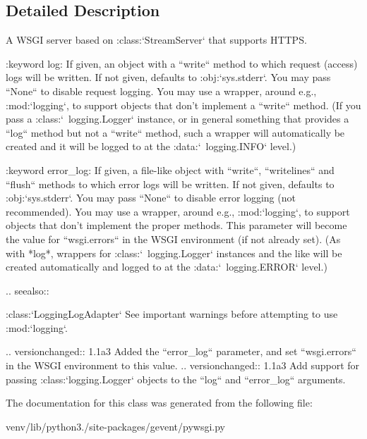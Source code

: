 \subsection{Detailed Description}
\begin{DoxyVerb}A WSGI server based on :class:`StreamServer` that supports HTTPS.


:keyword log: If given, an object with a ``write`` method to which
    request (access) logs will be written. If not given, defaults
    to :obj:`sys.stderr`. You may pass ``None`` to disable request
    logging. You may use a wrapper, around e.g., :mod:`logging`,
    to support objects that don't implement a ``write`` method.
    (If you pass a :class:`~logging.Logger` instance, or in
    general something that provides a ``log`` method but not a
    ``write`` method, such a wrapper will automatically be created
    and it will be logged to at the :data:`~logging.INFO` level.)

:keyword error_log: If given, a file-like object with ``write``,
    ``writelines`` and ``flush`` methods to which error logs will
    be written. If not given, defaults to :obj:`sys.stderr`. You
    may pass ``None`` to disable error logging (not recommended).
    You may use a wrapper, around e.g., :mod:`logging`, to support
    objects that don't implement the proper methods. This
    parameter will become the value for ``wsgi.errors`` in the
    WSGI environment (if not already set). (As with *log*,
    wrappers for :class:`~logging.Logger` instances and the like
    will be created automatically and logged to at the :data:`~logging.ERROR`
    level.)

.. seealso::

    :class:`LoggingLogAdapter`
        See important warnings before attempting to use :mod:`logging`.

.. versionchanged:: 1.1a3
    Added the ``error_log`` parameter, and set ``wsgi.errors`` in the WSGI
    environment to this value.
.. versionchanged:: 1.1a3
    Add support for passing :class:`logging.Logger` objects to the ``log`` and
    ``error_log`` arguments.
\end{DoxyVerb}
 

The documentation for this class was generated from the following file\+:\begin{DoxyCompactItemize}
\item 
venv/lib/python3./site-\/packages/gevent/pywsgi.\+py\end{DoxyCompactItemize}
